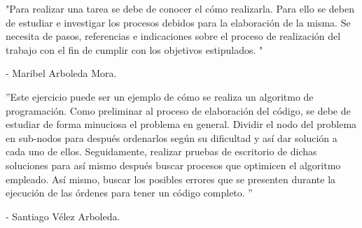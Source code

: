 \documentclass{article}
\begin{document}
"Para realizar una tarea se debe de conocer el cómo realizarla. Para ello se deben de estudiar e investigar los procesos debidos para la elaboración de la misma. Se necesita de pasos, referencias e indicaciones sobre el proceso de realización del trabajo con el fin de cumplir con los objetivos estipulados. "

- Maribel Arboleda Mora.

''Este ejercicio puede ser un ejemplo de cómo se realiza un algoritmo de programación. Como preliminar al proceso de elaboración del código, se debe de estudiar de forma minuciosa el problema en general. Dividir el nodo del problema en sub-nodos para después ordenarlos según su dificultad y así dar solución a cada uno de ellos. Seguidamente, realizar pruebas de escritorio de dichas soluciones para así mismo después buscar procesos que optimicen el algoritmo empleado. Así mismo, buscar los posibles errores que se presenten durante la ejecución de las órdenes para tener un código completo. ''

- Santiago Vélez Arboleda.
\end{document}
